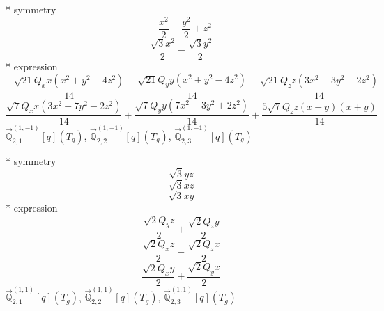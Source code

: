 \documentclass[fleqn,8pt]{jsarticle}
\begin{document}
\noindent\quad ** symmetry
\begin{dmath*}
- \frac{x^{2}}{2} - \frac{y^{2}}{2} + z^{2}
\end{dmath*}
\begin{dmath*}
\frac{\sqrt{3} x^{2}}{2} - \frac{\sqrt{3} y^{2}}{2}
\end{dmath*}
\noindent\quad ** expression
\begin{dmath*}
- \frac{\sqrt{21} Q_{x} x \left(x^{2} + y^{2} - 4 z^{2}\right)}{14} - \frac{\sqrt{21} Q_{y} y \left(x^{2} + y^{2} - 4 z^{2}\right)}{14} - \frac{\sqrt{21} Q_{z} z \left(3 x^{2} + 3 y^{2} - 2 z^{2}\right)}{14}
\end{dmath*}
\begin{dmath*}
\frac{\sqrt{7} Q_{x} x \left(3 x^{2} - 7 y^{2} - 2 z^{2}\right)}{14} + \frac{\sqrt{7} Q_{y} y \left(7 x^{2} - 3 y^{2} + 2 z^{2}\right)}{14} + \frac{5 \sqrt{7} Q_{z} z \left(x - y\right) \left(x + y\right)}{14}
\end{dmath*}
\noindent\quad $\vec{\mathbb{Q}}_{2,1}^{(1,-1)}[q](T_{g})$, $\vec{\mathbb{Q}}_{2,2}^{(1,-1)}[q](T_{g})$, $\vec{\mathbb{Q}}_{2,3}^{(1,-1)}[q](T_{g})$

\noindent\quad ** symmetry
\begin{dmath*}
\sqrt{3} y z
\end{dmath*}
\begin{dmath*}
\sqrt{3} x z
\end{dmath*}
\begin{dmath*}
\sqrt{3} x y
\end{dmath*}
\noindent\quad ** expression
\begin{dmath*}
\frac{\sqrt{2} Q_{y} z}{2} + \frac{\sqrt{2} Q_{z} y}{2}
\end{dmath*}
\begin{dmath*}
\frac{\sqrt{2} Q_{x} z}{2} + \frac{\sqrt{2} Q_{z} x}{2}
\end{dmath*}
\begin{dmath*}
\frac{\sqrt{2} Q_{x} y}{2} + \frac{\sqrt{2} Q_{y} x}{2}
\end{dmath*}
\noindent\quad $\vec{\mathbb{Q}}_{2,1}^{(1,1)}[q](T_{g})$, $\vec{\mathbb{Q}}_{2,2}^{(1,1)}[q](T_{g})$, $\vec{\mathbb{Q}}_{2,3}^{(1,1)}[q](T_{g})$
\end{document}
